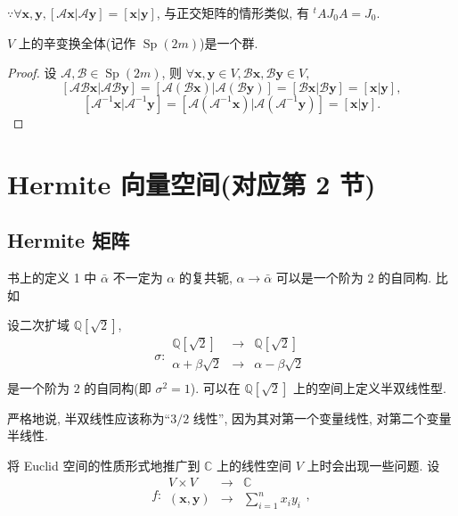 \documentclass{ctexart}
\begin{document}
$\because\forall\boldsymbol{x},\boldsymbol{y},[\mathcal{A}\boldsymbol{x}|\mathcal{A}\boldsymbol{y}]=[\boldsymbol{x}|\boldsymbol{y}]$, 与正交矩阵的情形类似, 有 ${}^tAJ_0A=J_0$.
\begin{theorem}
    $V$ 上的辛变换全体(记作 $\operatorname{Sp}(2m)$)是一个群.
\end{theorem}
\begin{proof}
    设 $\mathcal{A},\mathcal{B}\in\operatorname{Sp}(2m)$, 则 $\forall\boldsymbol{x},\boldsymbol{y}\in V,\mathcal{B}\boldsymbol{x},\mathcal{B}\boldsymbol{y}\in V,$
    \[[\mathcal{AB}\boldsymbol{x}|\mathcal{AB}\boldsymbol{y}]=[\mathcal{A}(\mathcal{B}\boldsymbol{x})|\mathcal{A}(\mathcal{B}\boldsymbol{y})]=[\mathcal{B}\boldsymbol{x}|\mathcal{B}\boldsymbol{y}]=[\boldsymbol{x}|\boldsymbol{y}],\]
    \[[\mathcal{A}^{-1}\boldsymbol{x}|\mathcal{A}^{-1}\boldsymbol{y}]=[\mathcal{A}(\mathcal{A}^{-1}\boldsymbol{x})|\mathcal{A}(\mathcal{A}^{-1}\boldsymbol{y})]=[\boldsymbol{x}|\boldsymbol{y}].\]
\end{proof}
\section{Hermite 向量空间(对应第 2 节)}
\subsection{Hermite 矩阵}
书上的定义 1 中 $\bar{\alpha}$ 不一定为 $\alpha$ 的复共轭, $\alpha\to\bar{\alpha}$ 可以是一个阶为 $2$ 的自同构. 比如
\begin{example}
    设二次扩域 $\mathbb{Q}[\sqrt{2}]$,
    \[\sigma:\begin{array}{rcl}
        \mathbb{Q}[\sqrt{2}] & \to & \mathbb{Q}[\sqrt{2}] \\
        \alpha+\beta\sqrt{2} & \to & \alpha-\beta\sqrt{2} \\
    \end{array}\]
    是一个阶为 $2$ 的自同构(即 $\sigma^2=1$). 可以在 $\mathbb{Q}[\sqrt{2}]$ 上的空间上定义半双线性型.
\end{example}
严格地说, 半双线性应该称为``$3/2$ 线性'', 因为其对第一个变量线性, 对第二个变量半线性.

将 Euclid 空间的性质形式地推广到 $\mathbb{C}$ 上的线性空间 $V$ 上时会出现一些问题. 设
\[f:\begin{array}{rcl}
    V\times V & \to & \mathbb{C} \\
    (\boldsymbol{x},\boldsymbol{y}) & \to & \sum\limits_{i=1}^nx_iy_i \\
\end{array},\]
\end{document}
